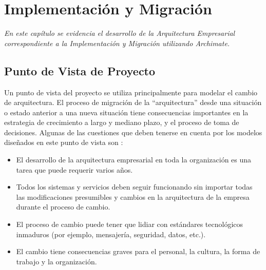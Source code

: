 \chapter{Implementación y Migración}
\label{chap:Implementacion}
\textit{En este capítulo se evidencia el desarrollo de la Arquitectura Empresarial correspondiente a la Implementación y Migración utilizando Archimate.}
\vspace{2ex}\vfill
\minitoc
\newpage

\section{Punto de Vista de Proyecto}
Un punto de vista del proyecto se utiliza principalmente para modelar el cambio de arquitectura. El proceso de migración de la “arquitectura” desde una situación o estado anterior a una nueva situación tiene consecuencias importantes en la estrategia de crecimiento a largo y mediano plazo, y el proceso de toma de decisiones. Algunas de las cuestiones que deben tenerse en cuenta por los modelos diseñados en este punto de vista son \cite{ref9}:
  
  \begin{itemize}
	\item El desarrollo de la arquitectura empresarial en toda la organización es una tarea que puede requerir varios años.
	\item Todos los sistemas y servicios deben seguir funcionando sin importar todas las modificaciones presumibles y cambios en la arquitectura de la empresa durante el proceso de cambio.
	\item El proceso de cambio puede tener que lidiar con estándares tecnológicos inmaduros (por ejemplo, mensajería, seguridad, datos, etc.).
	\item El cambio tiene consecuencias graves para el personal, la cultura, la forma de trabajo y la organización.
  \end{itemize}

